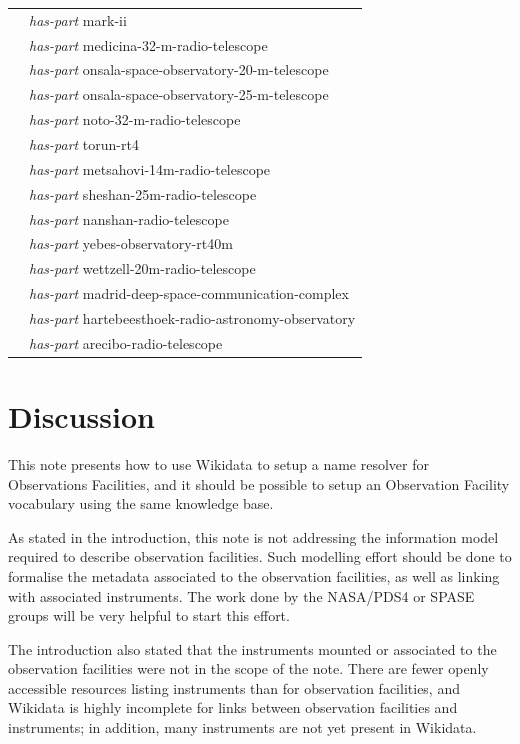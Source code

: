 \documentclass[11pt,a4paper]{ivoa}
\begin{document}
{\begin{longtable}{p{}p{}}
                        & \emph{has-part} mark-ii\\
                        & \emph{has-part} medicina-32-m-radio-telescope\\
                        & \emph{has-part} onsala-space-observatory-20-m-telescope\\
                        & \emph{has-part} onsala-space-observatory-25-m-telescope\\
                        & \emph{has-part} noto-32-m-radio-telescope\\
                        & \emph{has-part} torun-rt4\\
                        & \emph{has-part} metsahovi-14m-radio-telescope\\
                        & \emph{has-part} sheshan-25m-radio-telescope\\
                        & \emph{has-part} nanshan-radio-telescope\\
                        & \emph{has-part} yebes-observatory-rt40m\\
                        & \emph{has-part} wettzell-20m-radio-telescope\\
                        & \emph{has-part} madrid-deep-space-communication-complex\\
                        & \emph{has-part} hartebeesthoek-radio-astronomy-observatory\\
                        & \emph{has-part} arecibo-radio-telescope\\
\hline
\end{longtable}}

\section{Discussion}
This note presents how to use Wikidata to setup a name resolver 
for Observations Facilities, and it should be possible to setup 
an Observation Facility vocabulary using the same knowledge base.

As stated in the introduction, this note is not addressing the 
information model required to describe observation facilities. 
Such modelling effort should be done to formalise the metadata 
associated to the observation facilities, as well as linking 
with associated instruments. The work done by the NASA/PDS4 or
SPASE groups will be very helpful to start this effort. 

The introduction also stated that the instruments mounted or 
associated to the observation facilities were not in the scope
of the note. There are fewer openly accessible resources
listing instruments than for observation facilities, and 
Wikidata is highly incomplete for links between observation facilities
and instruments; in addition, many instruments
are not yet present in Wikidata.
\end{document}
